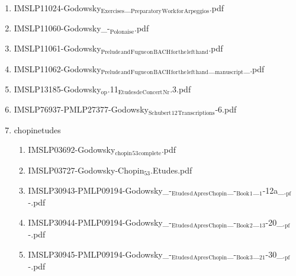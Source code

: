 \documentclass[11pt]{article}
\begin{document}
\begin{enumerate}
\item IMSLP11024-Godowsky$_{\text{Exercises}}$\_$_{\text{Preparatory}}$$_{\text{Work}}$$_{\text{for}}$$_{\text{Arpeggios}}$.pdf
\label{sec-1-1-1-1-44-34-15}

\item IMSLP11060-Godowsky\_-$_{\text{Polonaise}}$.pdf
\label{sec-1-1-1-1-44-34-16}

\item IMSLP11061-Godowsky$_{\text{Prelude}}$$_{\text{and}}$$_{\text{Fugue}}$$_{\text{on}}$$_{\text{BACH}}$$_{\text{for}}$$_{\text{the}}$$_{\text{left}}$$_{\text{hand}}$.pdf
\label{sec-1-1-1-1-44-34-17}

\item IMSLP11062-Godowsky$_{\text{Prelude}}$$_{\text{and}}$$_{\text{Fugue}}$$_{\text{on}}$$_{\text{BACH}}$$_{\text{for}}$$_{\text{the}}$$_{\text{left}}$$_{\text{hand}}$\_$_{\text{manuscript}}$\_.pdf
\label{sec-1-1-1-1-44-34-18}

\item IMSLP13185-Godowsky$_{\text{op}}$.11$_{\text{Etudes}}$$_{\text{de}}$$_{\text{Concert}}$$_{\text{Nr}}$.3.pdf
\label{sec-1-1-1-1-44-34-19}

\item IMSLP76937-PMLP27377-Godowsky$_{\text{Schubert}}$$_{\text{12}}$$_{\text{Transcriptions}}$-6.pdf
\label{sec-1-1-1-1-44-34-20}

\item chopinetudes
\label{sec-1-1-1-1-44-34-21}
\begin{enumerate}
\item IMSLP03692-Godowsky$_{\text{chopin}}$$_{\text{53}}$$_{\text{complete}}$.pdf
\label{sec-1-1-1-1-44-34-21-1}

\item IMSLP03727-Godowsky-Chopin$_{\text{53}}$.Etudes.pdf
\label{sec-1-1-1-1-44-34-21-2}

\item IMSLP30943-PMLP09194-Godowsky\_-$_{\text{Etudes}}$$_{\text{d}}$$_{\text{Apres}}$$_{\text{Chopin}}$\_-$_{\text{Book}}$$_{\text{1}}$\_$_{\text{1}}$-12a\_$_{\text{-pf}}$-.pdf
\label{sec-1-1-1-1-44-34-21-3}

\item IMSLP30944-PMLP09194-Godowsky\_-$_{\text{Etudes}}$$_{\text{d}}$$_{\text{Apres}}$$_{\text{Chopin}}$\_-$_{\text{Book}}$$_{\text{2}}$\_$_{\text{13}}$-20\_$_{\text{-pf}}$-.pdf
\label{sec-1-1-1-1-44-34-21-4}

\item IMSLP30945-PMLP09194-Godowsky\_-$_{\text{Etudes}}$$_{\text{d}}$$_{\text{Apres}}$$_{\text{Chopin}}$\_-$_{\text{Book}}$$_{\text{3}}$\_$_{\text{21}}$-30\_$_{\text{-pf}}$-.pdf
\label{sec-1-1-1-1-44-34-21-5}


\end{enumerate}
\end{enumerate}
\end{document}

